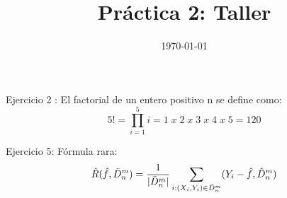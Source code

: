 \documentclass{article}
\title{Práctica 2: Taller}
\date{\today}
\begin{document}
\maketitle

Ejercicio 2 : 
El factorial de un entero positivo n se define como: 
\[5! = \prod_{i=1}^{5}i = 1 \; x \; 2 \; x \; 3 \; x \; 4 \; x \; 5 = 120\]

Ejercicio 5:  Fórmula rara:
\[\hat{R}(\hat{f}, \bar{D} ^{m} _{n}) =  \frac{1}{|\bar{D} ^{m} _{n}|} 
\sum_{i:(X _{i}, Y_{i}) \in \bar{D} ^{m}_{n}} (Y_{i} - \hat{f}, \hat{D} ^{m} _{n}) \]
\end{document}
